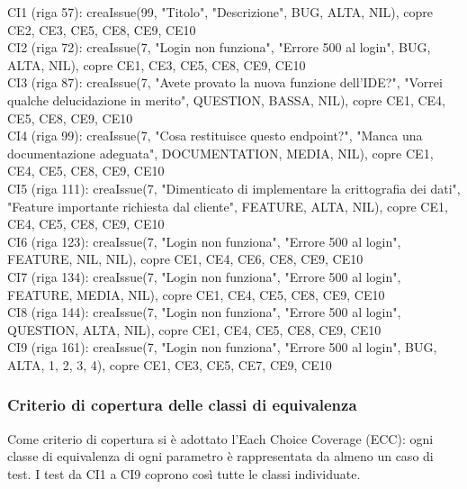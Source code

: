 \noindent CI1 (riga 57): creaIssue(99, "Titolo", "Descrizione", BUG, ALTA, NIL), copre CE2, CE3, CE5, CE8, CE9, CE10 \\
CI2 (riga 72): creaIssue(7, "Login non funziona", "Errore 500 al login", BUG, ALTA, NIL), copre CE1, CE3, CE5, CE8, CE9, CE10 \\
CI3 (riga 87): creaIssue(7, "Avete provato la nuova funzione dell'IDE?", "Vorrei qualche delucidazione in merito", QUESTION, BASSA, NIL), copre CE1, CE4, CE5, CE8, CE9, CE10 \\
CI4 (riga 99): creaIssue(7, "Cosa restituisce questo endpoint?", "Manca una documentazione adeguata", DOCUMENTATION, MEDIA, NIL), copre CE1, CE4, CE5, CE8, CE9, CE10 \\
CI5 (riga 111): creaIssue(7, "Dimenticato di implementare la crittografia dei dati", "Feature importante richiesta dal cliente", FEATURE, ALTA, NIL), copre CE1, CE4, CE5, CE8, CE9, CE10 \\
CI6 (riga 123): creaIssue(7, "Login non funziona", "Errore 500 al login", FEATURE, NIL, NIL), copre CE1, CE4, CE6, CE8, CE9, CE10 \\
CI7 (riga 134): creaIssue(7, "Login non funziona", "Errore 500 al login", FEATURE, MEDIA, NIL), copre CE1, CE4, CE5, CE8, CE9, CE10 \\
CI8 (riga 144): creaIssue(7, "Login non funziona", "Errore 500 al login", QUESTION, ALTA, NIL), copre CE1, CE4, CE5, CE8, CE9, CE10 \\
CI9 (riga 161): creaIssue(7, "Login non funziona", "Errore 500 al login", BUG, ALTA, {1, 2, 3, 4}), copre CE1, CE3, CE5, CE7, CE9, CE10 \\

\subsubsection{Criterio di copertura delle classi di equivalenza}
Come criterio di copertura si è adottato l'Each Choice Coverage (ECC): ogni 
classe di equivalenza di ogni parametro è rappresentata da almeno un caso di 
test. I test da CI1 a CI9 coprono così tutte le classi individuate.
